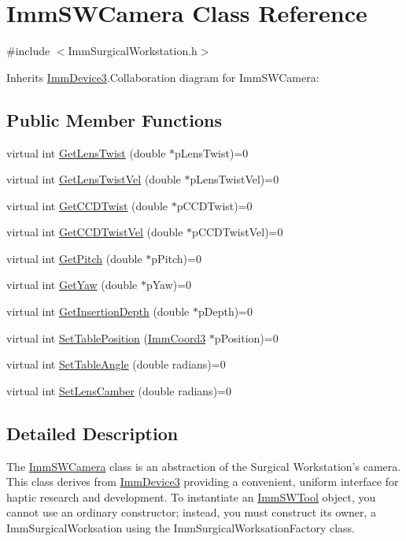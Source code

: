 \hypertarget{classImmSWCamera}{
\section{ImmSWCamera Class Reference}
\label{classImmSWCamera}
}


{\ttfamily \#include $<$ImmSurgicalWorkstation.h$>$}

Inherits \hyperlink{classImmDevice3}{ImmDevice3}.Collaboration diagram for ImmSWCamera:\subsection*{Public Member Functions}
\begin{DoxyCompactItemize}
\item 
virtual int \hyperlink{classImmSWCamera_a656a7adbf572cabcda4d020515d1fe5b}{GetLensTwist} (double $\ast$pLensTwist)=0
\item 
virtual int \hyperlink{classImmSWCamera_afadaf1d765231255f15a5d28994c5f8b}{GetLensTwistVel} (double $\ast$pLensTwistVel)=0
\item 
virtual int \hyperlink{classImmSWCamera_a0f65ede1aa1c3ef569b5efefa5e2e2df}{GetCCDTwist} (double $\ast$pCCDTwist)=0
\item 
virtual int \hyperlink{classImmSWCamera_ab198ad2477023e7576491561a5dfa6eb}{GetCCDTwistVel} (double $\ast$pCCDTwistVel)=0
\item 
virtual int \hyperlink{classImmSWCamera_a2d38c7834c0216d448f248a6f356274d}{GetPitch} (double $\ast$pPitch)=0
\item 
virtual int \hyperlink{classImmSWCamera_aa6225ae94cf2f697a563a96cc66be588}{GetYaw} (double $\ast$pYaw)=0
\item 
virtual int \hyperlink{classImmSWCamera_ad9c919c82f8b5776c348f779b352e9bf}{GetInsertionDepth} (double $\ast$pDepth)=0
\item 
virtual int \hyperlink{classImmSWCamera_a991cc8ff7f77821f5a5004c4900df4f6}{SetTablePosition} (\hyperlink{structImmCoord3}{ImmCoord3} $\ast$pPosition)=0
\item 
virtual int \hyperlink{classImmSWCamera_a2c2141e6da700240fbfa7ab75008e791}{SetTableAngle} (double radians)=0
\item 
virtual int \hyperlink{classImmSWCamera_a05587ccc045713d87234f0ea1395589a}{SetLensCamber} (double radians)=0
\end{DoxyCompactItemize}


\subsection{Detailed Description}
The \hyperlink{classImmSWCamera}{ImmSWCamera} class is an abstraction of the Surgical Workstation's camera. This class derives from \hyperlink{classImmDevice3}{ImmDevice3} providing a convenient, uniform interface for haptic research and development. To instantiate an \hyperlink{classImmSWTool}{ImmSWTool} object, you cannot use an ordinary constructor; instead, you must construct its owner, a ImmSurgicalWorksation using the ImmSurgicalWorksationFactory class.

